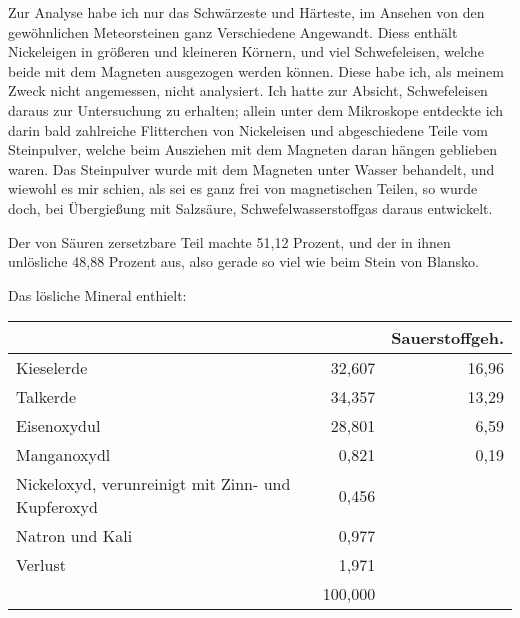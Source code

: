 \documentclass[a4paper, 11pt, oneside]{article}
\begin{document}
Zur Analyse habe ich nur das Schwärzeste und Härteste, im Ansehen von den gewöhnlichen Meteorsteinen ganz Verschiedene Angewandt. Diess enthält Nickeleigen in größeren und kleineren Körnern, und viel Schwefeleisen, welche beide mit dem Magneten ausgezogen werden können. Diese habe ich, als meinem Zweck nicht angemessen, nicht analysiert. Ich hatte zur Absicht, Schwefeleisen daraus zur Untersuchung zu erhalten; allein unter dem Mikroskope entdeckte ich darin bald zahlreiche Flitterchen von Nickeleisen und abgeschiedene Teile vom Steinpulver, welche beim Ausziehen mit dem Magneten daran hängen geblieben waren. Das Steinpulver wurde mit dem Magneten unter Wasser behandelt, und wiewohl es mir schien, als sei es ganz frei von magnetischen Teilen, so wurde doch, bei Übergießung mit Salzsäure, Schwefelwasserstoffgas daraus entwickelt.

Der von Säuren zersetzbare Teil machte 51,12 Prozent, und der in ihnen unlösliche 48,88 Prozent aus, also gerade so viel wie beim Stein von Blansko.

Das lösliche Mineral enthielt:
\begin{center}
\begin{tabular}{ |p{30mm}|r|r| }
    \hline
     &  & Sauerstoffgeh.\\\hline
    Kieselerde & 32,607 & 16,96\\\hline
    Talkerde & 34,357 & 13,29\\\hline
    Eisenoxydul & 28,801 & 6,59\\\hline
    Manganoxydl & 0,821 & 0,19\\\hline
    Nickeloxyd, verunreinigt mit Zinn- und Kupferoxyd & 0,456 & \\\hline
    Natron und Kali & 0,977 & \\\hline
    Verlust & 1,971 & \\\hline
    & 100,000 & \\
    \hline
\end{tabular}
\end{center}
\end{document}
